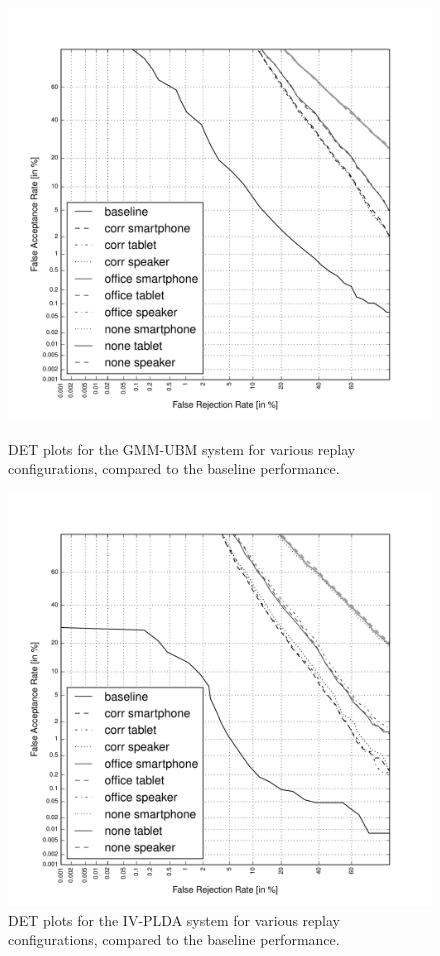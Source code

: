 

\begin{figure}
	\centering
	\begin{minipage}{.5\textwidth}
	\includegraphics[width=1\linewidth]{Figs/DETs_GMM.pdf}
	\caption{DET plots for the GMM-UBM system for various replay configurations, compared to the baseline performance.}
	\label{fig::DETs_replay_GMM}
	\end{minipage}
	\begin{minipage}{.5\textwidth}
	\includegraphics[width=1\linewidth]{Figs/DETs_IV.pdf}
	\caption{DET plots for the IV-PLDA system for various replay configurations, compared to the baseline performance.}
	\label{fig::DETs_replay_IV}
	\end{minipage}


\end{figure}



